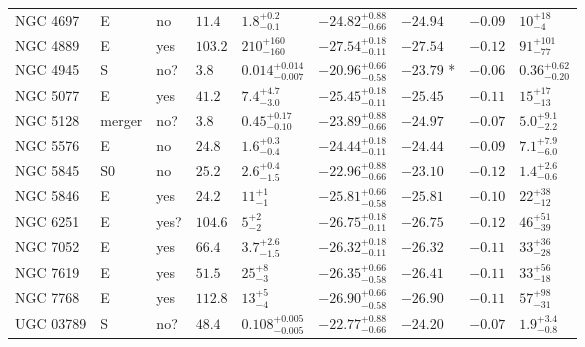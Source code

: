 \begin{table*}
\begin{center}
\begin{tabular}{lllllllll}
NGC 4697  &  E  &  no   &  $11.4$  &  $1.8_{-0.1}^{+0.2}$   &  $-24.82_{-0.66}^{+0.88}$   &  $-24.94$   &  $-0.09$  &  $10_{-4}^{+18}$   \\ 
NGC 4889  &  E  &  yes   &  $103.2$  &  $210_{-160}^{+160}$   &  $-27.54_{-0.11}^{+0.18}$   &  $-27.54$   &  $-0.12$  &  $91_{-77}^{+101}$   \\ 
NGC 4945  &  S  &  no?  &  $3.8$  &  $0.014_{-0.007}^{+0.014}$   &  $-20.96_{-0.58}^{+0.66}$   &  $-23.79$  *  &  $-0.06$  &  $0.36_{-0.20}^{+0.62}$   \\ 
NGC 5077  &  E  &  yes   &  $41.2$  &  $7.4_{-3.0}^{+4.7}$   &  $-25.45_{-0.11}^{+0.18}$   &  $-25.45$   &  $-0.11$  &  $15_{-13}^{+17}$   \\ 
NGC 5128  &  merger  &  no?  &  $3.8$  &  $0.45_{-0.10}^{+0.17}$   &  $-23.89_{-0.66}^{+0.88}$   &  $-24.97$   &  $-0.07$  &  $5.0_{-2.2}^{+9.1}$   \\ 
NGC 5576  &  E  &  no   &  $24.8$  &  $1.6_{-0.4}^{+0.3}$   &  $-24.44_{-0.11}^{+0.18}$   &  $-24.44$   &  $-0.09$  &  $7.1_{-6.0}^{+7.9}$   \\ 
NGC 5845  &  S0  &  no   &  $25.2$  &  $2.6_{-1.5}^{+0.4}$   &  $-22.96_{-0.66}^{+0.88}$   &  $-23.10$   &  $-0.12$  &  $1.4_{-0.6}^{+2.6}$   \\ 
NGC 5846  &  E  &  yes   &  $24.2$  &  $11_{-1}^{+1}$   &  $-25.81_{-0.58}^{+0.66}$   &  $-25.81$   &  $-0.10$  &  $22_{-12}^{+38}$   \\ 
NGC 6251  &  E  &  yes?  &  $104.6$  &  $5_{-2}^{+2}$   &  $-26.75_{-0.11}^{+0.18}$   &  $-26.75$   &  $-0.12$  &  $46_{-39}^{+51}$   \\ 
NGC 7052  &  E  &  yes   &  $66.4$  &  $3.7_{-1.5}^{+2.6}$   &  $-26.32_{-0.11}^{+0.18}$   &  $-26.32$   &  $-0.11$  &  $33_{-28}^{+36}$   \\ 
NGC 7619  &  E  &  yes   &  $51.5$  &  $25_{-3}^{+8}$   &  $-26.35_{-0.58}^{+0.66}$   &  $-26.41$   &  $-0.11$  &  $33_{-18}^{+56}$   \\ 
NGC 7768  &  E  &  yes   &  $112.8$  &  $13_{-4}^{+5}$   &  $-26.90_{-0.58}^{+0.66}$   &  $-26.90$   &  $-0.11$  &  $57_{-31}^{+98}$   \\ 
UGC 03789  &  S  &  no?  &  $48.4$  &  $0.108_{-0.005}^{+0.005}$   &  $-22.77_{-0.66}^{+0.88}$   &  $-24.20$   &  $-0.07$  &  $1.9_{-0.8}^{+3.4}$   \\ 
\hline         
\end{tabular}   
\end{center}    
\end{table*}    
